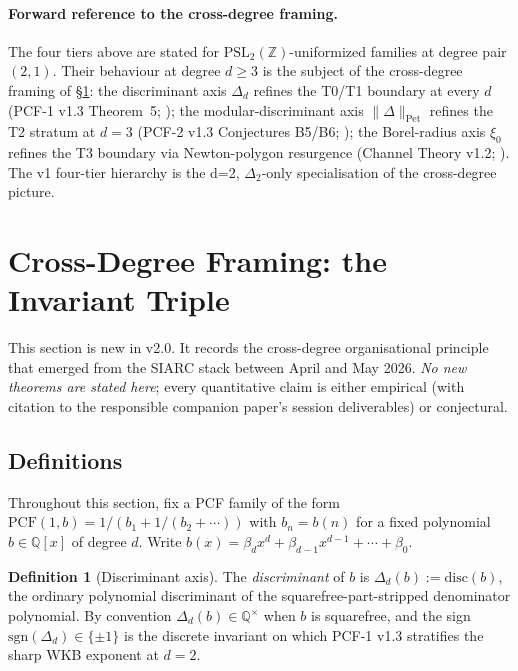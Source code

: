 \documentclass[11pt,a4paper]{article}
\theoremstyle{definition}
\newtheorem{definition}[conjecture]{Definition}
\theoremstyle{remark}
\newcommand{\PSLZ}{\mathrm{PSL}_2(\mathbb{Z})}
\newcommand{\PCF}{\mathrm{PCF}}
\newcommand{\Q}{\mathbb{Q}}
\newcommand{\PetN}[1]{\lVert #1 \rVert_{\mathrm{Pet}}}
\begin{document}
\paragraph{Forward reference to the cross-degree framing.}
\label{par:forward-ref-triple}
The four tiers above are stated for $\PSLZ$-uniformized families at
degree pair $(2,1)$. Their behaviour at degree $d \geq 3$ is the subject
of the cross-degree framing of \S\ref{sec:triple}: the discriminant axis
$\Delta_d$ refines the T0/T1 boundary at every $d$ (PCF-1 v1.3
Theorem~5; \cite{PCF1}); the modular-discriminant axis $\PetN{\Delta}$
refines the T2 stratum at $d=3$ (PCF-2 v1.3 Conjectures B5/B6;
\cite{PCF2}); the Borel-radius axis $\xi_0$ refines the T3 boundary
via Newton-polygon resurgence (Channel Theory v1.2; \cite{CT}). The
v1 four-tier hierarchy is the d=2, $\Delta_2$-only specialisation of
the cross-degree picture.

\section{Cross-Degree Framing: the Invariant Triple}
\label{sec:triple}

This section is new in v2.0. It records the cross-degree
organisational principle that emerged from the SIARC stack between
April and May 2026. \emph{No new theorems are stated here}; every
quantitative claim is either empirical (with citation to the responsible
companion paper's session deliverables) or conjectural.

\subsection{Definitions}
\label{sec:triple-defs}

Throughout this section, fix a PCF family of the form
$\PCF(1, b) = 1/(b_1 + 1/(b_2 + \cdots))$ with $b_n = b(n)$ for a fixed
polynomial $b \in \Q[x]$ of degree $d$. Write
$b(x) = \beta_d x^d + \beta_{d-1} x^{d-1} + \cdots + \beta_0$.

\begin{definition}[Discriminant axis]
\label{def:disc-axis}
The \emph{discriminant} of $b$ is $\Delta_d(b) := \mathrm{disc}(b)$, the
ordinary polynomial discriminant of the squarefree-part-stripped
denominator polynomial. By convention $\Delta_d(b) \in \Q^\times$ when
$b$ is squarefree, and the sign $\mathrm{sgn}(\Delta_d) \in \{\pm 1\}$
is the discrete invariant on which PCF-1 v1.3 stratifies the sharp
WKB exponent at $d=2$.
\end{definition}
\end{document}
